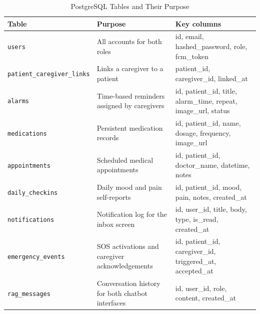 \documentclass[12pt,a4paper]{report}
\begin{document}
\begin{table}[H]
\centering
\caption{PostgreSQL Tables and Their Purpose}
\label{tab:db_tables}
{\small
\begin{tabularx}{\textwidth}{@{}lXX@{}}
\toprule
\textbf{Table}                     & \textbf{Purpose}                                   & \textbf{Key columns} \\
\midrule
\texttt{users}                     & All accounts for both roles                        & id, email, hashed\_password, role, fcm\_token \\
\texttt{patient\_caregiver\_links} & Links a caregiver to a patient                     & patient\_id, caregiver\_id, linked\_at \\
\texttt{alarms}                    & Time-based reminders assigned by caregivers        & id, patient\_id, title, alarm\_time, repeat, image\_url, status \\
\texttt{medications}               & Persistent medication records                      & id, patient\_id, name, dosage, frequency, image\_url \\
\texttt{appointments}              & Scheduled medical appointments                     & id, patient\_id, doctor\_name, datetime, notes \\
\texttt{daily\_checkins}           & Daily mood and pain self-reports                   & id, patient\_id, mood, pain, notes, created\_at \\
\texttt{notifications}             & Notification log for the inbox screen              & id, user\_id, title, body, type, is\_read, created\_at \\
\texttt{emergency\_events}         & SOS activations and caregiver acknowledgements     & id, patient\_id, caregiver\_id, triggered\_at, accepted\_at \\
\texttt{rag\_messages}             & Conversation history for both chatbot interfaces   & id, user\_id, role, content, created\_at \\
\bottomrule
\end{tabularx}}
\end{table}
\end{document}
